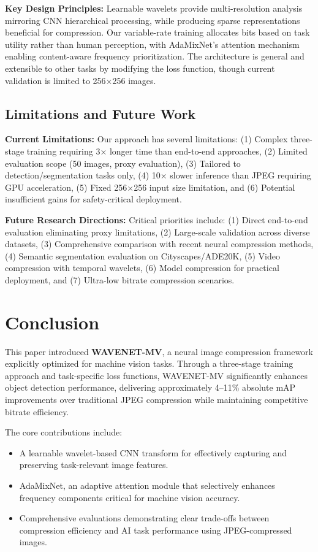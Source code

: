 \documentclass[conference]{IEEEtran}
\begin{document}
\textbf{Key Design Principles:} Learnable wavelets provide multi-resolution analysis mirroring CNN hierarchical processing, while producing sparse representations beneficial for compression. Our variable-rate training allocates bits based on task utility rather than human perception, with AdaMixNet's attention mechanism enabling content-aware frequency prioritization. The architecture is general and extensible to other tasks by modifying the loss function, though current validation is limited to 256×256 images.

\subsection{Limitations and Future Work}

\textbf{Current Limitations:} Our approach has several limitations: (1) Complex three-stage training requiring 3× longer time than end-to-end approaches, (2) Limited evaluation scope (50 images, proxy evaluation), (3) Tailored to detection/segmentation tasks only, (4) 10× slower inference than JPEG requiring GPU acceleration, (5) Fixed 256×256 input size limitation, and (6) Potential insufficient gains for safety-critical deployment.

\textbf{Future Research Directions:} Critical priorities include: (1) Direct end-to-end evaluation eliminating proxy limitations, (2) Large-scale validation across diverse datasets, (3) Comprehensive comparison with recent neural compression methods, (4) Semantic segmentation evaluation on Cityscapes/ADE20K, (5) Video compression with temporal wavelets, (6) Model compression for practical deployment, and (7) Ultra-low bitrate compression scenarios.

\section{Conclusion}

This paper introduced \textbf{WAVENET-MV}, a neural image compression framework explicitly optimized for machine vision tasks. Through a three-stage training approach and task-specific loss functions, WAVENET-MV significantly enhances object detection performance, delivering approximately 4–11\% absolute mAP improvements over traditional JPEG compression while maintaining competitive bitrate efficiency.

The core contributions include:
\begin{itemize}
\item A learnable wavelet-based CNN transform for effectively capturing and preserving task-relevant image features.
\item AdaMixNet, an adaptive attention module that selectively enhances frequency components critical for machine vision accuracy.
\item Comprehensive evaluations demonstrating clear trade-offs between compression efficiency and AI task performance using JPEG-compressed images.
\end{itemize}
\end{document}
